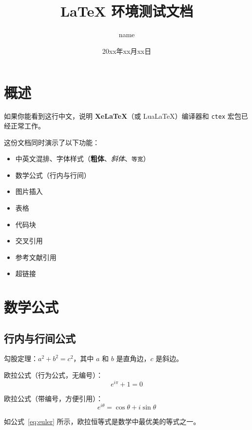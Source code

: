 \documentclass[a4paper,12pt]{ctexart}  %
\title{\textbf{LaTeX 环境测试文档}}
\author{name}
\date{20xx年xx月xx日}
\begin{document}
\maketitle           %
\tableofcontents     %
\newpage

\section{概述}

如果你能看到这行中文，说明 \textbf{XeLaTeX}（或 LuaLaTeX）编译器和 \texttt{ctex} 宏包已经正常工作。

这份文档同时演示了以下功能：
\begin{itemize}
    \item 中英文混排、字体样式（\textbf{粗体}、\textit{斜体}、\texttt{等宽}）
    \item 数学公式（行内与行间）
    \item 图片插入
    \item 表格
    \item 代码块
    \item 交叉引用
    \item 参考文献引用
    \item 超链接
\end{itemize}

\section{数学公式}
\label{sec:math}

\subsection{行内与行间公式}

勾股定理：$a^2 + b^2 = c^2$，其中 $a$ 和 $b$ 是直角边，$c$ 是斜边。

欧拉公式（行为公式，无编号）：
\[
    e^{i\pi} + 1 = 0
\]

欧拉公式（带编号，方便引用）：
\begin{equation}
    e^{i\theta} = \cos\theta + i\sin\theta
    \label{eq:euler}
\end{equation}

如公式~\ref{eq:euler} 所示，欧拉恒等式是数学中最优美的等式之一。
\end{document}

